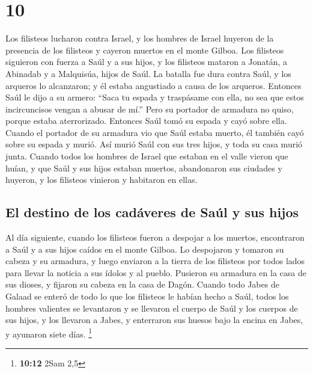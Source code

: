 \hypertarget{section-9}{%
\section{10}\label{section-9}}

 Los filisteos lucharon contra Israel, y los hombres de
Israel huyeron de la presencia de los filisteos y cayeron muertos en el
monte Gilboa.  Los filisteos siguieron con fuerza a Saúl y
a sus hijos, y los filisteos mataron a Jonatán, a Abinadab y a
Malquisúa, hijos de Saúl.  La batalla fue dura contra
Saúl, y los arqueros lo alcanzaron; y él estaba angustiado a causa de
los arqueros.  Entonces Saúl le dijo a su armero: ``Saca
tu espada y traspásame con ella, no sea que estos incircuncisos vengan a
abusar de mí.'' Pero su portador de armadura no quiso, porque estaba
aterrorizado. Entonces Saúl tomó su espada y cayó sobre ella.
 Cuando el portador de su armadura vio que Saúl estaba
muerto, él también cayó sobre su espada y murió.  Así
murió Saúl con sus tres hijos, y toda su casa murió junta.
 Cuando todos los hombres de Israel que estaban en el
valle vieron que huían, y que Saúl y sus hijos estaban muertos,
abandonaron sus ciudades y huyeron, y los filisteos vinieron y habitaron
en ellas.

\hypertarget{el-destino-de-los-caduxe1veres-de-sauxfal-y-sus-hijos}{%
\subsection{El destino de los cadáveres de Saúl y sus
hijos}\label{el-destino-de-los-caduxe1veres-de-sauxfal-y-sus-hijos}}

 Al día siguiente, cuando los filisteos fueron a despojar
a los muertos, encontraron a Saúl y a sus hijos caídos en el monte
Gilboa.  Lo despojaron y tomaron su cabeza y su armadura,
y luego enviaron a la tierra de los filisteos por todos lados para
llevar la noticia a sus ídolos y al pueblo.  Pusieron su
armadura en la casa de sus dioses, y fijaron su cabeza en la casa de
Dagón.  Cuando todo Jabes de Galaad se enteró de todo lo
que los filisteos le habían hecho a Saúl,  todos los
hombres valientes se levantaron y se llevaron el cuerpo de Saúl y los
cuerpos de sus hijos, y los llevaron a Jabes, y enterraron sus huesos
bajo la encina en Jabes, y ayunaron siete días. \footnote{\textbf{10:12}
  2Sam 2,5}

